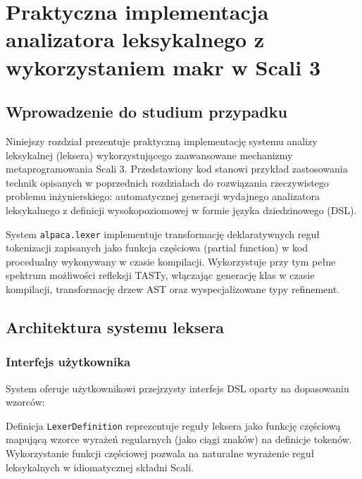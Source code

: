 \section{Praktyczna implementacja analizatora leksykalnego z wykorzystaniem makr w Scali 3}\label{ch:praktyczna-implementacja-analizatora-leksykalnego-z-wykorzystaniem-makr-w-scali-3}

\subsection{Wprowadzenie do studium przypadku}\label{subsec:wprowadzenie-do-studium-przypadku}

Niniejszy rozdział prezentuje praktyczną implementację systemu analizy leksykalnej (leksera) wykorzystującego zaawansowane mechanizmy metaprogramowania Scali 3.
Przedstawiony kod stanowi przykład zastosowania technik opisanych w poprzednich rozdziałach do rozwiązania rzeczywistego problemu inżynierskiego: automatycznej generacji wydajnego analizatora leksykalnego z definicji wysokopoziomowej w formie języka dziedzinowego (DSL).

System \texttt{alpaca.lexer} implementuje transformację deklaratywnych reguł tokenizacji zapisanych jako funkcja częściowa (partial function) w kod procedualny wykonywany w czasie kompilacji.
Wykorzystuje przy tym pełne spektrum możliwości refleksji TASTy, włączając generację klas w czasie kompilacji, transformację drzew AST oraz wyspecjalizowane typy refinement.

\subsection{Architektura systemu leksera}\label{subsec:architektura-systemu-leksera}

\subsubsection{Interfejs użytkownika}\label{subsubsec:interfejs-uzytkownika}

System oferuje użytkownikowi przejrzysty interfejs DSL oparty na dopasowaniu wzorców:



Definicja \texttt{LexerDefinition} reprezentuje reguły leksera jako funkcję częściową mapującą wzorce wyrażeń regularnych (jako ciągi znaków) na definicje tokenów.
Wykorzystanie funkcji częściowej pozwala na naturalne wyrażenie reguł leksykalnych w idiomatycznej składni Scali.


